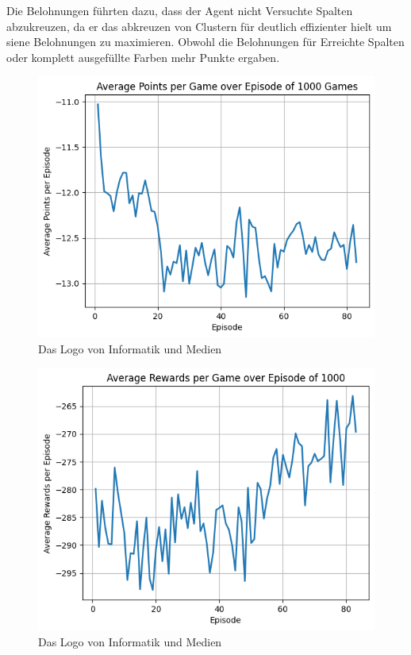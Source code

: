 Die Belohnungen führten dazu, dass der Agent nicht Versuchte Spalten abzukreuzen, da er das abkreuzen von Clustern für deutlich effizienter hielt um siene Belohnungen zu maximieren.
Obwohl die Belohnungen für Erreichte Spalten oder komplett ausgefüllte Farben mehr Punkte ergaben.


\begin{figure}[!t]
    \centering
    \includegraphics[scale=0.6]{Bilder/average_points.png}
    \caption{Das Logo von Informatik und Medien }
\end{figure}

\begin{figure}[!t]
    \centering
    \includegraphics[scale=0.6]{Bilder/average_rewards.png}
    \caption{Das Logo von Informatik und Medien }
\end{figure}

